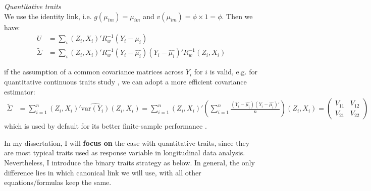 \documentclass[12pt]{article}
\begin{document}
\textit{Quantitative traits}\\
\indent We use the identity link, i.e. $g(\mu_{im}) = \mu_{im}$ and $v(\mu_{im}) = \phi \times 1 = \phi$. Then we have:
\begin{align}
U & = \sum_{i}\left(Z_{i},X_{i}\right)' R_w^{-1} (Y_{i}-\mu_{i}) \nonumber\\
\widetilde{\Sigma} & = \sum_{i}\left(Z_{i},X_{i}\right)' R_w^{-1} (Y_{i}-\hat{\mu_{i}})(Y_{i}-\hat{\mu_{i}})' R_w^{-1} \left(Z_{i},X_{i}\right)
\label{eq:2}
\end{align}

if the assumption of a common covariance matrices across $Y_i$ for $i$ is valid, e.g. for quantitative continuous traits study \cite{pan2001robust}, we can adopt a more efficient covariance estimator:
\begin{align*}
\widetilde{\Sigma} & = \sum_{i=1}^n \left(Z_{i},X_{i}\right)'\widehat{\textrm{var}(Y_{i})}\left(Z_{i},X_{i}\right)
 = \sum_{i=1}^n \left(Z_{i},X_{i}\right)'\left(\sum_{i=1}^n \frac{(Y_{i}-\hat{\mu_{i}})(Y_{i}-\hat{\mu_{i}})'}{n}\right)\left(Z_{i},X_{i}\right) = 
\begin{pmatrix}
V_{11} & V_{12}\\
 V_{21} & V_{22}
\end{pmatrix}
\end{align*}
which is used by default for its better finite-sample performance \cite{pan2001robust}.

In my dissertation, I will \textbf{focus on} the case with quantitative traits, since they are most typical traits used as response variable in longitudinal data analysis. Nevertheless, I introduce the binary traits strategy as below. In general, the only difference lies in which canonical link we will use, with all other equations/formulas keep the same.
\end{document}
